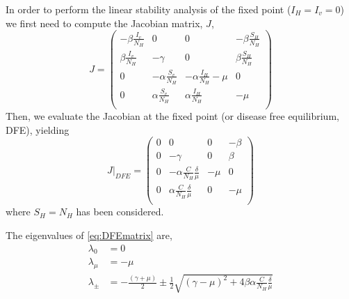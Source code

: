 In order to perform the linear stability analysis of the fixed point
($I_H=I_v=0$) we first need to compute the Jacobian matrix, $J$,
\begin{equation}
    J = \begin{pmatrix}
        -\beta \frac{I_v}{N_H} & 0                       & 0       & - \beta
        \frac{S_H}{N_H}                                                      \\
        \beta  \frac{I_v}{N_H} & -\gamma                 & 0       & \beta
        \frac{S_H}{N_H}                                                      \\
        0                      & -\alpha \frac{S_v}{N_H} & -\alpha
        \frac{I_H}{N_H} - \mu  & 0                                           \\
        0                      & \alpha \frac{S_v}{N_H}  & \alpha
        \frac{I_H}{N_H}        & - \mu                                       \\
    \end{pmatrix}
\end{equation}
Then, we evaluate the Jacobian at the fixed point (or disease
free equilibrium, DFE), yielding
\begin{equation}
    J\rvert_{DFE} = \begin{pmatrix}
        0     & 0                                       & 0 & - \beta \\
        0     & -\gamma                                 & 0 & \beta   \\
        0     & -\alpha \frac{C}{N_H}\frac{\delta}{\mu} &
        - \mu & 0                                                     \\
        0     & \alpha \frac{C}{N_H}\frac{\delta}{\mu}  & 0
              & - \mu                                                 \\
    \end{pmatrix}
    \label{eq:DFEmatrix}
\end{equation}
where $S_H=N_H$ has been considered.

The eigenvalues of \cref{eq:DFEmatrix} are,
\begin{equation}
    \begin{split}
        \lambda_0 &= 0 \\
        \lambda_\mu &= -\mu \\
        \lambda_{\pm} &= -\frac{(\gamma+\mu)}{2} \pm
        \frac{1}{2}\sqrt{ (\gamma-\mu)^2 +4\beta \alpha
            \frac{C}{N_H}\frac{\delta}{\mu}
        }
    \end{split}
\end{equation}

